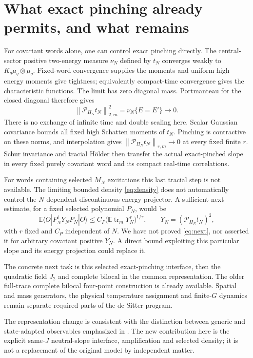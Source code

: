\documentclass[11pt]{article}
\newcommand{\E}{\mathbb E}
\newcommand{\tr}{\operatorname{tr}}
\newcommand{\norm}[1]{\left\lVert#1\right\rVert}
\begin{document}
\newpage
\section{What exact pinching already permits, and what remains}
For covariant words alone, one can control exact pinching directly.
The central-sector positive two-energy measure $\nu_N$ defined by
$t_N$ converges weakly to $K_q\mu_q\otimes\mu_q$.
Fixed-word convergence supplies the moments and uniform high energy
moments give tightness; equivalently compact-time convergence gives
the characteristic functions. The limit has zero diagonal mass.
Portmanteau for the closed diagonal therefore gives
\begin{equation}
 \norm{\mathcal P_{H_N}t_N}_{2,m}^2
    =\nu_N\{E=E'\}\longrightarrow0.
\end{equation}
There is no exchange of infinite time and double scaling here.
Scalar Gaussian covariance bounds all fixed high Schatten moments
of $t_N$. Pinching is contractive on these norms, and interpolation
gives $\norm{\mathcal P_{H_N}t_N}_{r,m}\to0$ at every fixed finite
$r$. Schur invariance and tracial H\"older then transfer the actual
exact-pinched slope in every fixed purely covariant word and its
compact real-time correlations.

For words containing selected $M_N$ excitations this last tracial
step is not available. The limiting bounded density
\eqref{eq:density} does not automatically control the
$N$-dependent discontinuous energy projector. A sufficient next
estimate, for a fixed selected polynomial $P_N$, would be
\begin{equation}\label{eq:next}
 \E\langle O|P_N^\dagger Y_NP_N|O\rangle
 \le C_P\bigl(\E\tr_m Y_N^r\bigr)^{1/r},\qquad
 Y_N=(\mathcal P_{H_N}t_N)^2,
\end{equation}
with $r$ fixed and $C_P$ independent of $N$. We have not proved
\eqref{eq:next}, nor asserted it for arbitrary covariant positive
$Y_N$. A direct bound exploiting this particular slope and its
energy projection could replace it.

The concrete next task is this selected exact-pinching interface,
then the quadratic field $J_2$ and complete bilocal in the common
representation. The older full-trace complete bilocal four-point
construction is already available. Spatial and mass generators,
the physical temperature assignment and finite-$G$ dynamics remain
separate required parts of the de Sitter program.

The representation change is consistent with the distinction
between generic and state-adapted observables emphasized in
\cite{RX}. The new contribution here is the explicit same-$J$
neutral-slope interface, amplification and selected density;
it is not a replacement of the original model by independent matter.
\end{document}
